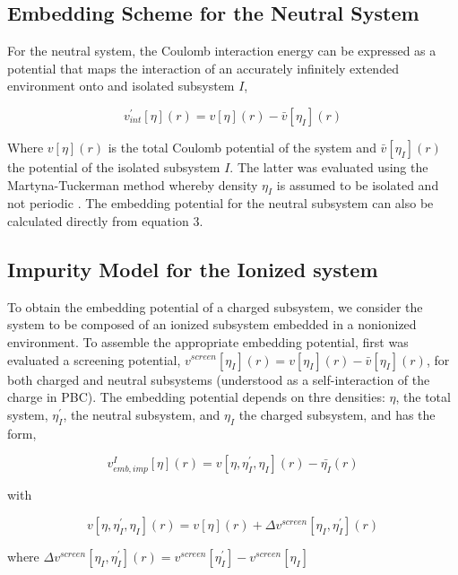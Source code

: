 \documentclass[12pt,a4paper]{article}
\begin{document}
\subsection{Embedding Scheme for the Neutral System}

For the neutral system, the Coulomb interaction energy can be expressed as a potential that maps the interaction of an accurately infinitely extended
environment onto and isolated subsystem $I$,

\begin{equation}
	v^{'}_{int} [\eta] (r) = v[\eta](r) - \bar{v} [\eta_I](r)
\end{equation}

Where $v[\eta](r)$ is the total Coulomb potential of the system and $\bar{v} [\eta_I](r)$ the potential of the isolated subsystem $I$. The latter was
evaluated using the Martyna-Tuckerman method whereby density $\eta_I$ is assumed to be isolated and not periodic \cite{martyna1999reciprocal}.
The embedding potential for the neutral subsystem can also be calculated directly from equation $3$.

\subsection{Impurity Model for the Ionized system}

To obtain the embedding potential of a charged subsystem, we consider the system to be composed of an ionized subsystem embedded in a nonionized
environment. To assemble the appropriate embedding potential, first was evaluated a screening potential,
$v^{screen}[\eta_I](r) = v[\eta_I](r) - \bar{v} [\eta_I](r)$, for both charged and neutral subsystems (understood as a self-interaction of the
charge in PBC). The embedding potential depends on thre densities: $\eta$, the total system, $\eta^{'}_I$, the neutral subsystem, and $\eta_I$ the
charged subsystem, and has the form,

\begin{equation}
	v^I_{emb,imp}[\eta](r) = v[\eta, \eta^{'}_I, \eta_I](r) - \bar{\eta_I}(r)
\end{equation}

with

\begin{equation}
	v[\eta, \eta^{'}_I, \eta_I](r) = v[\eta](r) + \Delta{v}^{screen}[\eta_I, \eta^{'}_I](r)
\end{equation}

where $\Delta{v}^{screen}[\eta_I, \eta^{'}_I](r) = {v}^{screen}[\eta^{'}_I] - {v}^{screen}[\eta_I]$
\end{document}
